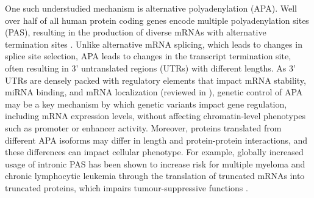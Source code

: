 One such understudied mechanism is alternative polyadenylation (APA). Well over half of all human protein coding genes encode multiple polyadenylation sites (PAS), resulting in the production of diverse mRNAs with alternative termination sites \citep{tian_alternative_2017, mayr_evolution_2016, shi_alternative_2012}. Unlike alternative mRNA splicing, which leads to changes in splice site selection, APA leads to changes in the transcript termination site, often resulting in 3' untranslated regions (UTRs) with different lengths. As 3' UTRs are densely packed with regulatory elements that impact mRNA stability, miRNA binding, and mRNA localization (reviewed in \citep{mayr_regulation_2017,tian_alternative_2017}), genetic control of APA may be a key mechanism by which genetic variants impact gene regulation, including mRNA expression levels, without affecting chromatin-level phenotypes such as promoter or enhancer activity. Moreover, proteins translated from different APA isoforms may differ in length and protein-protein interactions, and these differences can impact cellular phenotype. For example, globally increased usage of intronic PAS has been shown to increase risk for multiple myeloma and chronic lymphocytic leukemia \citep{lee_widespread_2018, singh_widespread_2018} through the translation of truncated mRNAs into truncated proteins, which impairs tumour-suppressive functions \citep{lee_widespread_2018, singh_widespread_2018}. 

